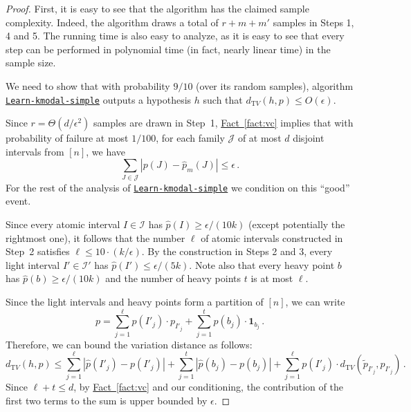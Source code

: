 \documentclass[10pt]{article}
\theoremstyle{definition}
\numberwithin{equation}{section}
\newcommand{\expref}[2]{\texorpdfstring{\hyperref[#2]{#1~\ref{#2}}}{#1~\ref{#2}}}
\newcommand{\algorithml}[1]{{\normalfont\texttt{#1}}}
\newcommand{\bm}{\mathbf} %
\newcommand{\dtv}{d_{\mathrm TV}}
\newcommand{\eps}{\epsilon}
\newcommand{\wh}[1]{{\widehat{#1}}}
\begin{document}
\begin{proof} 
{First, it is easy to see that the algorithm has the claimed sample complexity.
Indeed, the algorithm draws a total of $r+m+m'$ samples in Steps 1, 4 and 5. 
The running time is also easy to analyze, as it is easy to see that
every step can be performed in polynomial time (in fact, nearly linear time)
in the sample size.}

We need to show that with probability $9/10$
(over its random samples), algorithm
\hyperref[alg:learn-kmodal-simple]{\algorithml{Learn-kmodal-{\allowbreak}simple}} outputs a hypothesis $h$ such that $\dtv(h,p) \leq O(\eps)$.


{Since $r = \Theta(d/\eps^2)$ samples are drawn in Step~1, \expref{Fact}{fact:vc}
implies that with probability of failure at most $1/100$,
for each family $\mathcal{J}$ of at most $d$ disjoint intervals from $[n]$, we have
\begin{equation} \label{eqn:cond}
\sum_{J \in \mathcal{J}} |p(J) - \widehat{p}_m(J)|  \le \eps\,.
\end{equation}
}
For the rest of the analysis of \hyperref[alg:learn-kmodal-simple]{\algorithml{Learn-kmodal-simple}}
we condition on this ``good'' event.

Since every atomic interval $I \in \mathcal{I}$ has $\wh{p}(I) \geq
\eps/(10k)$ (except potentially the rightmost one), it follows that the
number $\ell$ of atomic intervals constructed in Step~2 satisfies $\ell \leq
10 \cdot (k/\eps)$.  {By the construction in Steps 2 and 3,
every light interval $I'  \in \mathcal{I}'$ has $\wh{p}(I')  \leq \eps/(5k)$.}
Note also that every heavy point $b$ has $\wh{p}(b) \geq \eps/(10k)$ and
the number of heavy points $t$ is at most $\ell$.

%

Since the light intervals and heavy points form a partition of $[n]$, we
can write $$p =  \sum_{j=1}^{\ell} p(I'_j) \cdot p_{I'_j} + \sum_{j=1}^t p(b_j) \cdot {\bm 1}_{b_j}\,.$$
Therefore, we can bound the variation distance as follows:
\begin{equation} \label{eqn:dtv-ub}
\dtv(h,p) \leq  \sum_{j=1}^{\ell} |  \wh{p}(I'_j)  - p(I'_j) | +  \sum_{j=1}^t |  \wh{p}(b_j) - p(b_j)| 
 + \sum_{j=1}^{\ell} p(I'_j) \cdot \dtv (\widetilde{p}_{I'_j}, p_{I'_j})\,.
\end{equation}
{Since $\ell+t \le d$, by \expref{Fact}{fact:vc} and our conditioning, the contribution of the first two terms 
to the sum is upper bounded by $\eps$.}


\end{proof}
\end{document}
